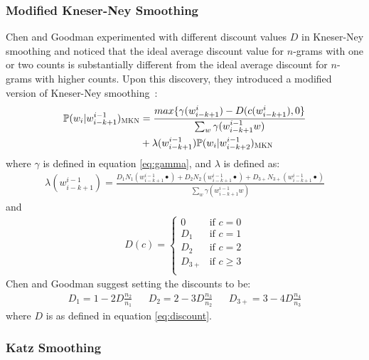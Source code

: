 \documentclass[a4paper, 12pt]{report}
\begin{document}
\subsubsection{Modified Kneser-Ney Smoothing}

Chen and Goodman experimented with different discount values $D$ in Kneser-Ney smoothing and noticed that the ideal average discount value for $n$-grams with one or two counts is substantially different from the ideal average discount for $n$-grams with higher counts. Upon this discovery, they introduced a modified version of Kneser-Ney smoothing~\cite{modified_kneser_ney:chen1999}:
\begin{equation*}
\begin{aligned}
	\mathbb{P}(w_i | w_{i - k + 1}^{i - 1})_{\text{\scshape MKN}} &= \frac{max\{\gamma(w_{i - k + 1}^{i}) - D(c(w_{i - k + 1}^{i}), 0\}}{\sum_w \gamma(w_{i - k + 1}^{i - 1}w)} \\
	&+ \lambda(w_{i - k + 1}^{i - 1})\mathbb{P}(w_i | w_{i - k + 2}^{i - 1})_{\text{\scshape MKN}}
\end{aligned}
\end{equation*}
where $\gamma$ is defined in equation \ref{eq:gamma}, and $\lambda$ is defined as:
\begin{gather*}
	\lambda(w_{i - k + 1}^{i - 1}) = \frac{D_1N_1(w_{i - k + 1}^{i - 1}\bullet) + D_2N_2(w_{i - k + 1}^{i - 1}\bullet) + D_{3+}N_{3+}(w_{i - k + 1}^{i - 1}\bullet)}{\sum_w \gamma(w_{i - k + 1}^{i - 1}w)}
\end{gather*}
and
\begin{gather*}
	D(c) = \begin{cases}
		0 &\text{if }c = 0 \\
		D_1 &\text{if }c = 1 \\
		D_2 &\text{if }c = 2 \\
		D_{3+} &\text{if }c \geq 3 \\
	\end{cases}
\end{gather*}
Chen and Goodman suggest setting the discounts to be:
\begin{align*}
	D_1 = 1 - 2D\frac{n_2}{n_1} && D_2 = 2 - 3D\frac{n_3}{n_2} && D_{3+} = 3 - 4D\frac{n_4}{n_3}
\end{align*}
where $D$ is as defined in equation \ref{eq:discount}.

\subsubsection{Katz Smoothing}
\end{document}
